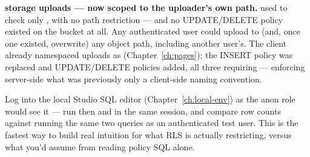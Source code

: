 \begin{olknote}
\textbf{ storage uploads — now scoped to the uploader's own path.}  used to check only , with no path restriction — and no UPDATE/DELETE policy existed on the bucket at all. Any authenticated user could upload to (and, once one existed, overwrite) any object path, including another user's. The client already namespaced uploads as  (Chapter~\ref{ch:pages}); the INSERT policy was replaced and UPDATE/DELETE policies added, all three requiring  — enforcing server-side what was previously only a client-side naming convention.
\end{olknote}

\begin{olktask}
Log into the local Studio SQL editor (Chapter~\ref{ch:local-env}) as the anon role would see it — run  then  and  in the same session, and compare row counts against running the same two queries as an authenticated test user. This is the fastest way to build real intuition for what RLS is actually restricting, versus what you'd assume from reading policy SQL alone.
\end{olktask}
